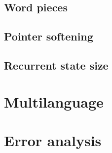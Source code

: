 \subsection{Word pieces}
\subsection{Pointer softening}
\subsection{Recurrent state size}

\section{Multilanguage}

\section{Error analysis}
